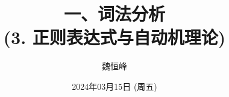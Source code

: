 \documentclass[]{beamer}
\title[词法分析]{一、词法分析 \\ (3. 正则表达式与自动机理论)}
\author[魏恒峰]{\large 魏恒峰}
\institute{hfwei@nju.edu.cn}
\date{2024年03月15日 (周五)}
\begin{document}
\maketitle













\thankyou{}

\end{document}

